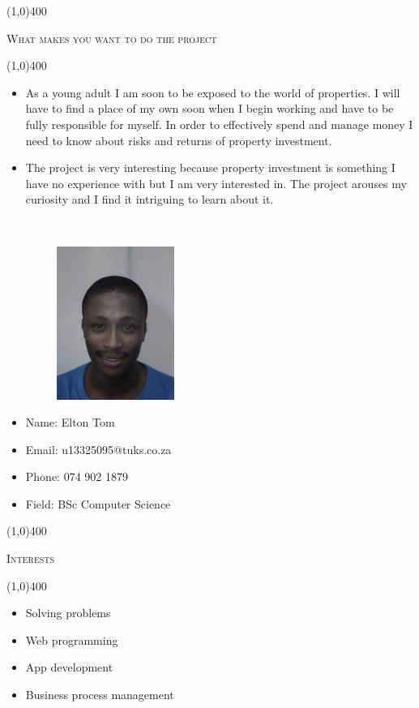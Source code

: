 \documentclass[12pt,a4paper]{report}
\begin{document}
\begin{center}
	
	\line(1,0){400}\\
	{\scshape\large What makes you want to do the project\par}
	\line(1,0){400}\\
	\end{center}
		\begin{itemize}
\item As a young adult I am soon to be exposed to the world of properties. I will have to find a place of my own soon when I begin working and have to be fully responsible for myself. In order to effectively spend and manage money I need to know about risks and returns of property investment.

\item The project is very interesting because property investment is something I have no experience with but I am very interested in. The project arouses my curiosity and I find it intriguing to learn about it.
\end{itemize}

\newpage
\vspace*{-3cm}\
\begin{minipage}{0.5\textwidth}
\begin{figure}[H]
\includegraphics[width=5cm,height=5cm,keepaspectratio]{u13325095.jpeg}
\end{figure}
\end{minipage} \hfill
\begin{minipage}{0.6\textwidth}
\begin{itemize}
\item[] Name: Elton Tom
\item[] Email: u13325095@tuks.co.za
\item[] Phone: 074 902 1879
\item[] Field: BSc Computer Science
\end{itemize}
\end{minipage}

\begin{center}
	
	\line(1,0){400}\\
	{\scshape\large Interests\par}
	\line(1,0){400}\\
	\end{center}
	\begin{itemize}
	\item 
		Solving problems
	\item 
		Web programming
	\item 
		App development
	\item 
		Business process management
	\end{itemize}
	
\end{document}
